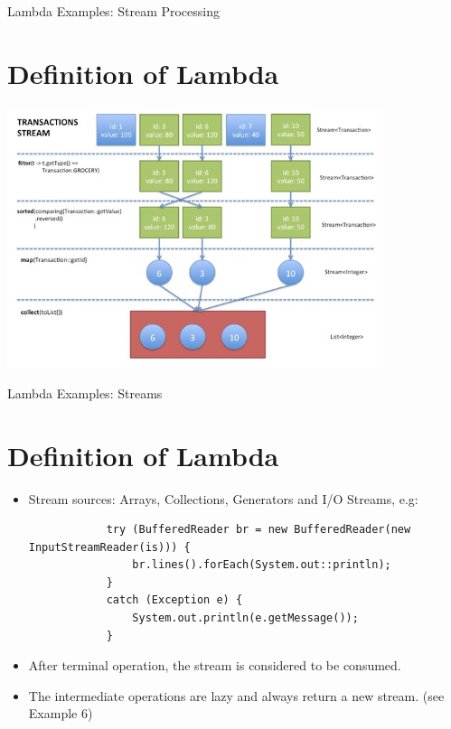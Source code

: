 \documentclass{beamer}
\begin{document}
	\begin{frame}[fragile]{Lambda Examples: Stream Processing}
		\section{Definition of Lambda}
		
		\includegraphics[width=11cm]{processing}	
		
	\end{frame}	
	
	\begin{frame}[fragile]{Lambda Examples: Streams}
		\section{Definition of Lambda}
		
		\begin{itemize}
			\item Stream sources: Arrays, Collections, Generators and I/O Streams, e.g:
				
			\begin{lstlisting}
			try (BufferedReader br = new BufferedReader(new InputStreamReader(is))) {
			    br.lines().forEach(System.out::println);
			}
			catch (Exception e) {
			    System.out.println(e.getMessage());
			}
   			\end{lstlisting}
			
			\item After terminal operation, the stream is considered to be consumed.
			\item The intermediate operations are lazy and always return a new stream. (see Example 6)
				
		\end{itemize}
		
	\end{frame}	
	
\end{document}
